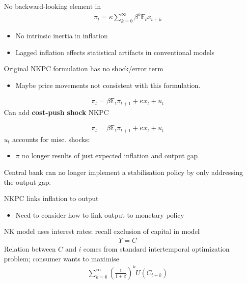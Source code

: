 \documentclass{beamer}
\begin{document}
\begin{frame}
 No backward-looking element in
\begin{align}  
  \pi_t=\kappa \sum_{k=0}^{\infty}\beta^k \mathbb{E}_t x_{t+k} 
\end{align}
\begin{itemize}
  \item No intrinsic inertia in inflation
  \item Lagged inflation effects statistical artifacts in conventional models
\end{itemize}
\medskip
Original NKPC formulation has no shock/error term
\begin{itemize}
  \item Maybe price movements not consistent with this formulation.
\end{itemize}
\begin{align}
  \pi_t=\beta \mathbb{E}_t \pi_{t+1} + \kappa x_t + u_t
\end{align} 
\medskip
Can add \textbf{cost-push shock} NKPC  
\end{frame}

\begin{frame}
  \begin{align}
  \pi_t=\beta \mathbb{E}_t \pi_{t+1} + \kappa x_t + u_t
\end{align} 
 $u_t$ accounts for misc. shocks:
 \begin{itemize}
   \item $\pi$ no longer results of just expected inflation and output gap
 \end{itemize}
 \medskip
 Central bank can no longer implement a stabilisation policy by only addressing the output gap. 
\end{frame}

\begin{frame}
  NKPC links inflation to output
  \begin{itemize}
    \item Need to consider how to link output to monetary policy
  \end{itemize}
  \medskip  
  NK model uses interest rates: recall exclusion of capital in model
  \begin{align}
    Y=C
  \end{align}
   Relation between $C$ and $i$ comes from standard intertemporal optimization problem; consumer wants to maximise
\begin{align}  
 \sum_{k=0}^{\infty}\left(\frac{1}{1+\beta}\right)^k U(C_{t+k}) 
 \end{align}  
\end{frame}
\end{document}
